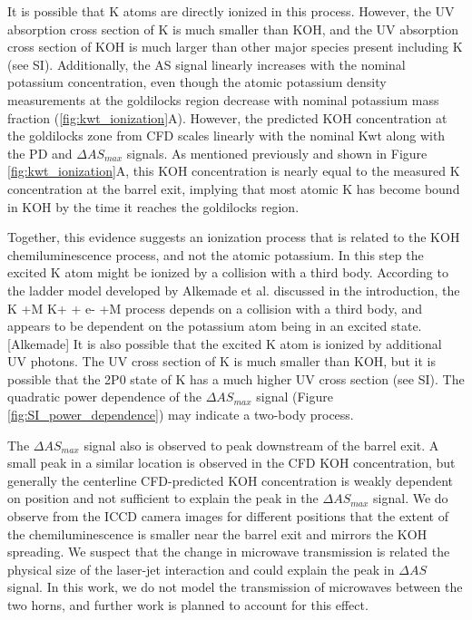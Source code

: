 It is possible that K atoms are directly ionized in this process. However, the UV absorption cross section of K is much smaller than KOH, and the UV absorption cross section of KOH is much larger than other major species present including K (see SI). Additionally, the AS signal linearly increases with the nominal potassium concentration, even though the atomic potassium density measurements at the goldilocks region decrease with nominal potassium mass fraction (\ref{fig:kwt_ionization}A). However, the predicted KOH concentration at the goldilocks zone from CFD scales linearly with the nominal Kwt along with the PD and $\Delta AS_{max}$ signals. As mentioned previously and shown in Figure \ref{fig:kwt_ionization}A, this KOH concentration is nearly equal to the measured K concentration at the barrel exit, implying that most atomic K has become bound in KOH by the time it reaches the goldilocks region.

Together, this evidence suggests an ionization process that is related to the KOH chemiluminescence process, and not the atomic potassium. In this step the excited K atom might be ionized by a collision with a third body. According to the ladder model developed by Alkemade et al. discussed in the introduction, the K +M \rightarrow K+ + e- +M process depends on a collision with a third body, and appears to be dependent on the potassium atom being in an excited state.[Alkemade] It is also possible that the excited K atom is ionized by additional UV photons. The UV cross section of K is much smaller than KOH, but it is possible that the 2P0 state of K has a much higher UV cross section (see SI). The quadratic power dependence of the $\Delta AS_{max}$ signal (Figure \ref*{fig:SI_power_dependence}) may indicate a two-body process. 

The $\Delta AS_{max}$ signal also is observed to peak downstream of the barrel exit. A small peak in a similar location is observed in the CFD KOH concentration, but generally the centerline CFD-predicted KOH concentration is weakly dependent on position and not sufficient to explain the peak in the $\Delta AS_{max}$ signal. We do observe from the ICCD camera images for different positions that the extent of the chemiluminescence is smaller near the barrel exit and mirrors the KOH spreading. We suspect that the change in microwave transmission is related the physical size of the laser-jet interaction and could explain the peak in $\Delta AS$ signal. In this work, we do not model the transmission of microwaves between the two horns, and further work is planned to account for this effect.

